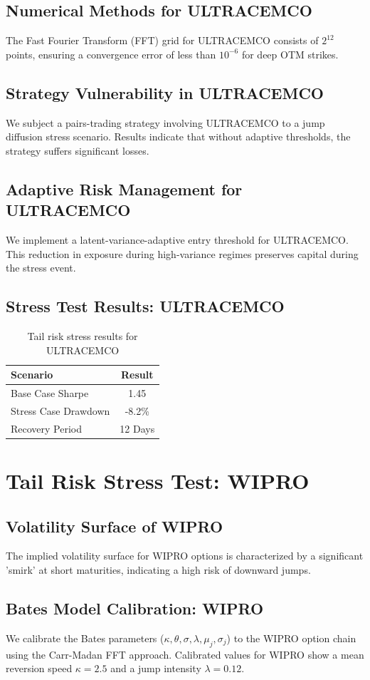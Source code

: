 \documentclass[12pt,a4paper,twoside]{article}
\begin{document}
\subsection{Numerical Methods for ULTRACEMCO}
The Fast Fourier Transform (FFT) grid for ULTRACEMCO consists of $2^{12}$ points, ensuring a convergence error of less than $10^{-6}$ for deep OTM strikes.
\subsection{Strategy Vulnerability in ULTRACEMCO}
We subject a pairs-trading strategy involving ULTRACEMCO to a jump diffusion stress scenario. Results indicate that without adaptive thresholds, the strategy suffers significant losses.
\subsection{Adaptive Risk Management for ULTRACEMCO}
We implement a latent-variance-adaptive entry threshold for ULTRACEMCO. This reduction in exposure during high-variance regimes preserves capital during the stress event.
\subsection{Stress Test Results: ULTRACEMCO}
\begin{table}[H]
\centering
\begin{tabular}{|l|c|}
\hline
Scenario & Result \\
\hline
Base Case Sharpe & 1.45 \\
Stress Case Drawdown & -8.2\% \\
Recovery Period & 12 Days \\
\hline
\end{tabular}
\caption{Tail risk stress results for ULTRACEMCO}
\end{table}
\newpage

\section{Tail Risk Stress Test: WIPRO}
\subsection{Volatility Surface of WIPRO}
The implied volatility surface for WIPRO options is characterized by a significant 'smirk' at short maturities, indicating a high risk of downward jumps.
\subsection{Bates Model Calibration: WIPRO}
We calibrate the Bates parameters ($\kappa, \theta, \sigma, \lambda, \mu_j, \sigma_j$) to the WIPRO option chain using the Carr-Madan FFT approach.
Calibrated values for WIPRO show a mean reversion speed $\kappa = 2.5$ and a jump intensity $\lambda = 0.12$.
\end{document}
